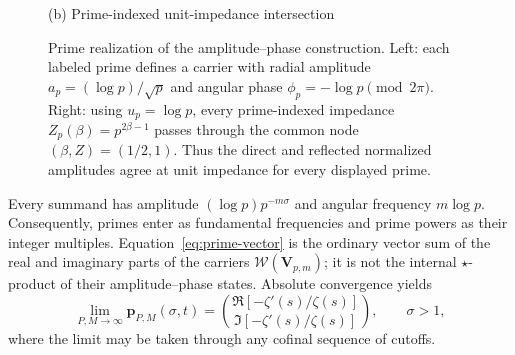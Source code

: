 \documentclass[11pt]{article}
\begin{document}
\begin{figure}[H]
\begin{minipage}[t]{0.48\linewidth}
\end{minipage}\hfill
\begin{minipage}[t]{0.48\linewidth}
\centering
{}
\par\scriptsize (b) Prime-indexed unit-impedance intersection
\end{minipage}
\caption{Prime realization of the amplitude--phase construction.  Left: each labeled prime
defines a carrier with radial amplitude $a_p=(\log p)/\sqrt p$ and angular phase
$\phi_p=-\log p\pmod{2\pi}$.  Right: using $u_p=\log p$, every prime-indexed impedance
$Z_p(\beta)=p^{2\beta-1}$ passes through the common node $(\beta,Z)=(1/2,1)$.  Thus the
direct and reflected normalized amplitudes agree at unit impedance for every displayed prime.}
\label{fig:prime-amplitude-phase-impedance}
\end{figure}

Every summand has amplitude $(\log p)p^{-m\sigma}$ and angular frequency $m\log p$.
Consequently, primes enter as fundamental frequencies and prime powers as their integer
multiples.  Equation~\eqref{eq:prime-vector} is the ordinary vector sum of the real and
imaginary parts of the carriers $\mathcal W(\mathbf V_{p,m})$; it is not the internal
$\star$-product of their amplitude--phase states.  Absolute convergence yields
\begin{equation}\label{eq:prime-vector-limit}
 \lim_{P,M\to\infty}\mathbf p_{P,M}(\sigma,t)
 =\binom{\Re[-\zeta'(s)/\zeta(s)]}{\Im[-\zeta'(s)/\zeta(s)]},
 \qquad \sigma>1,
\end{equation}
where the limit may be taken through any cofinal sequence of cutoffs.
\end{document}
